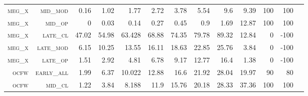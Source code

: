 \begin{landscape}
\begin{table}[!htbp]
\begin{tabular}{@{}rrrrrrrrrr|rrr@{}}
\footnotesize \textsc{meg\_x}      & \footnotesize \textsc{mid\_mod  }                & \footnotesize 0.16          & \footnotesize 1.02           & \footnotesize 1.77             & \footnotesize 2.72            & \footnotesize 3.78            & \footnotesize 5.54            & \footnotesize 9.6        & \footnotesize 9.39     & \footnotesize 100    & \footnotesize 100    \\
\footnotesize \textsc{meg\_x}      & \footnotesize \textsc{mid\_op   }                & \footnotesize 0             & \footnotesize 0.03           & \footnotesize 0.14             & \footnotesize 0.27            & \footnotesize 0.45            & \footnotesize 0.9             & \footnotesize 1.69       & \footnotesize 12.87    & \footnotesize 100    & \footnotesize 100    \\
\footnotesize \textsc{meg\_x}      & \footnotesize \textsc{late\_cl  }                & \footnotesize 47.02         & \footnotesize 54.98          & \footnotesize 63.428           & \footnotesize 68.88           & \footnotesize 74.35           & \footnotesize 79.78           & \footnotesize 89.32      & \footnotesize 12.84    & \footnotesize 0      & \footnotesize -100    \\
\footnotesize \textsc{meg\_x}      & \footnotesize \textsc{late\_mod }                & \footnotesize 6.15          & \footnotesize 10.25          & \footnotesize 13.55            & \footnotesize 16.11           & \footnotesize 18.63           & \footnotesize 22.85           & \footnotesize 25.76      & \footnotesize 3.84     & \footnotesize 0      & \footnotesize -100    \\
\footnotesize \textsc{meg\_x}      & \footnotesize \textsc{late\_op  }                & \footnotesize 1.51          & \footnotesize 2.92           & \footnotesize 4.81             & \footnotesize 6.78            & \footnotesize 9.17            & \footnotesize 12.77           & \footnotesize 16.4       & \footnotesize 1.38     & \footnotesize 0      & \footnotesize -100    \\
\footnotesize \textsc{ocfw}        & \footnotesize \textsc{early\_all}                & \footnotesize 1.99          & \footnotesize 6.37           & \footnotesize 10.022           & \footnotesize 12.88           & \footnotesize 16.6            & \footnotesize 21.92           & \footnotesize 28.04      & \footnotesize 19.97    & \footnotesize 90     & \footnotesize 80    \\
\footnotesize \textsc{ocfw}        & \footnotesize \textsc{mid\_cl   }                & \footnotesize 1.22          & \footnotesize 3.84           & \footnotesize 8.188            & \footnotesize 11.9            & \footnotesize 15.76           & \footnotesize 20.18           & \footnotesize 28.33      & \footnotesize 37.36    & \footnotesize 100    & \footnotesize 100    \\

\end{tabular}
\end{table}
\end{landscape}

